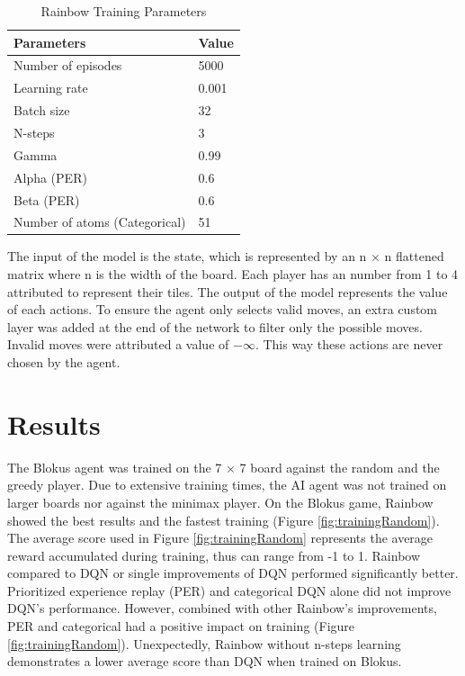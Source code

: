 \documentclass{article}
\begin{document}
\begin{table}[H]
\centering
\begin{tabular}{ll}
\hline
 Parameters & Value \\
\hline
Number of episodes & 5000 \\
Learning rate & 0.001 \\
Batch size & 32 \\
N-steps & 3 \\
Gamma & 0.99 \\
Alpha (PER) & 0.6 \\
Beta (PER) & 0.6 \\
Number of atoms (Categorical) & 51 \\
\hline
\end{tabular}
\caption{Rainbow Training Parameters}
\label{tab:rainbowparams}
\end{table}

The input of the model is the state, which is represented by an n $\times$ n flattened matrix where n is the width of the board. Each player has an number from 1 to 4 attributed to represent their tiles. The output of the model represents the value of each actions. To ensure the agent only selects valid moves, an extra custom layer was added at the end of the network to filter only the possible moves. Invalid moves were attributed a value of $-\infty$. This way these actions are never chosen by the agent.

\section{Results}

The Blokus agent was trained on the 7 $\times$ 7 board against the random and the greedy player. Due to extensive training times, the AI agent was not trained on larger boards nor against the minimax player. On the Blokus game, Rainbow showed the best results and the fastest training (Figure \ref{fig:trainingRandom}). The average score used in Figure \ref{fig:trainingRandom} represents the average reward accumulated during training, thus can range from -1 to 1. Rainbow compared to DQN or single improvements of DQN performed significantly better. Prioritized experience replay (PER) and categorical DQN alone did not improve DQN's performance. However, combined with other Rainbow's improvements, PER and categorical had a positive impact on training (Figure \ref{fig:trainingRandom}). Unexpectedly, Rainbow without n-steps learning demonstrates a lower average score than DQN when trained on Blokus.
\end{document}
